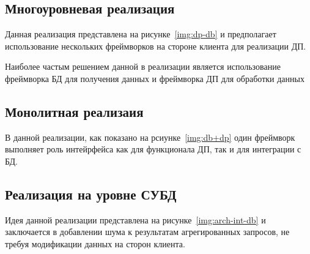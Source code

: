 
\subsection{Многоуровневая реализация}
Данная реализация представлена на рисунке~\ref{img:dp-db} и предполагает использование нескольких фреймворков на стороне клиента для реализации ДП.

Наиболее частым решением данной в реализации является использование фреймворка БД для получения данных и фреймворка ДП для обработки данных~\cite{main}


\subsection{Монолитная реализаия}
В данной реализации, как показано на рсиунке~\ref{img:db+dp} один фреймворк выполняет роль интейрфейса как для функционала ДП, так и для интеграции с БД.


\subsection{Реализация на уровне СУБД}
Идея данной реализации представлена на рисунке~\ref{img:arch-int-db} и заключается в добавлении шума к результатам агрегированных запросов, не требуя модификации данных на сторон клиента.

